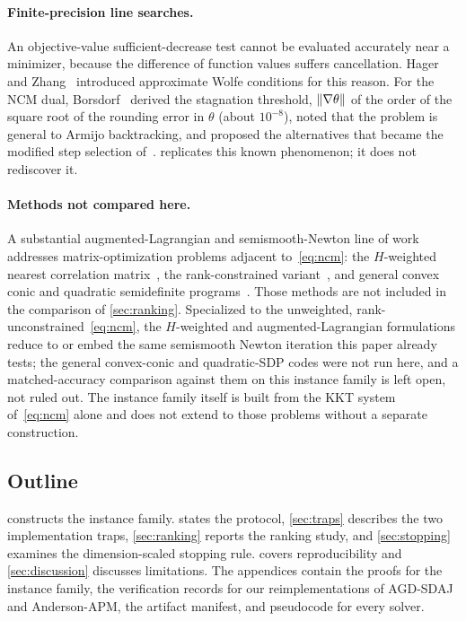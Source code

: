 \paragraph{Finite-precision line searches.}
An objective-value sufficient-decrease test cannot be evaluated accurately near
a minimizer, because the difference of function values suffers cancellation.
Hager and Zhang~\cite{hager2005new} introduced approximate Wolfe conditions
for this reason. For the NCM dual, Borsdorf~\cite[\S4.7.1]{borsdorf2007newton}
derived the stagnation threshold, $\lVert \nabla\theta\rVert$ of the order of the
square root of the rounding error in $\theta$ (about $10^{-8}$), noted that
the problem is general to Armijo backtracking, and proposed the alternatives
that became the modified step selection of~\cite{borsdorf2010preconditioned}.
 replicates this known phenomenon; it does not rediscover it.

\paragraph{Methods not compared here.}
A substantial augmented-Lagrangian and semismooth-Newton line of work
addresses matrix-optimization problems adjacent to~\eqref{eq:ncm}: the
$H$-weighted nearest correlation matrix~\cite{qisun2011augmented}, the
rank-constrained variant~\cite{gao2010majorized}, and general convex conic and
quadratic semidefinite programs~\cite{zhao2010newtoncg,jiang2012inexact,cui2019superlinear}.
Those methods are not included in the comparison of \cref{sec:ranking}.
Specialized to the unweighted, rank-unconstrained~\eqref{eq:ncm}, the
$H$-weighted and augmented-Lagrangian formulations reduce to or embed the
same semismooth Newton iteration this paper already tests; the general
convex-conic and quadratic-SDP codes were not run here, and a
matched-accuracy comparison against them on this instance family is left
open, not ruled out. The instance family itself is built from the KKT system
of~\eqref{eq:ncm} alone and does not extend to those problems without a
separate construction.

\subsection{Outline}
 constructs the instance family.  states
the protocol, \cref{sec:traps} describes the two implementation traps,
\cref{sec:ranking} reports the ranking study, and \cref{sec:stopping}
examines the dimension-scaled stopping rule.  covers
reproducibility and \cref{sec:discussion} discusses limitations. The
appendices contain the proofs for the instance family, the verification
records for our reimplementations of AGD-SDAJ and Anderson-APM, the artifact
manifest, and pseudocode for every solver.
